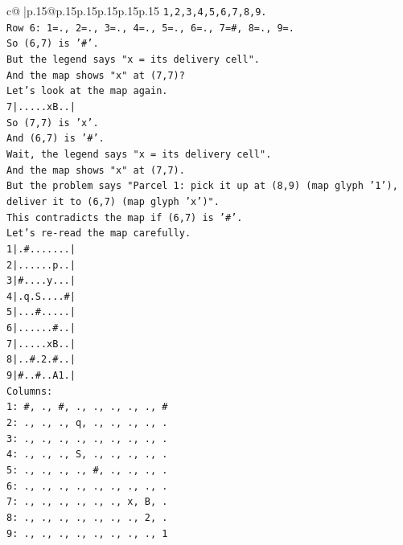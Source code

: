 \documentclass{article}
\begin{document}
{\begin{supertabular}{c@{$\;$}|p{.15\linewidth}@{}p{.15\linewidth}p{.15\linewidth}p{.15\linewidth}p{.15\linewidth}p{.15\linewidth}}
{{{\texttt{1,2,3,4,5,6,7,8,9.} \\
\texttt{Row 6: 1=., 2=., 3=., 4=., 5=., 6=., 7=\#, 8=., 9=.} \\
\texttt{So (6,7) is '\#'.} \\
\texttt{But the legend says "x = its delivery cell".} \\
\texttt{And the map shows "x" at (7,7)?} \\
\texttt{Let's look at the map again.} \\
\texttt{7|.....xB..|} \\
\texttt{So (7,7) is 'x'.} \\
\texttt{And (6,7) is '\#'.} \\
\texttt{Wait, the legend says "x = its delivery cell".} \\
\texttt{And the map shows "x" at (7,7).} \\
\texttt{But the problem says "Parcel 1: pick it up at (8,9) (map glyph '1'), deliver it to (6,7) (map glyph 'x')".} \\
\texttt{This contradicts the map if (6,7) is '\#'.} \\
\texttt{Let's re{-}read the map carefully.} \\
\texttt{1|.\#.......|} \\
\texttt{2|......p..|} \\
\texttt{3|\#....y...|} \\
\texttt{4|.q.S....\#|} \\
\texttt{5|...\#.....|} \\
\texttt{6|......\#..|} \\
\texttt{7|.....xB..|} \\
\texttt{8|..\#.2.\#..|} \\
\texttt{9|\#..\#..A1.|} \\
\texttt{Columns:} \\
\texttt{1: \#, ., \#, ., ., ., ., ., \#} \\
\texttt{2: ., ., ., q, ., ., ., ., .} \\
\texttt{3: ., ., ., ., ., ., ., ., .} \\
\texttt{4: ., ., ., S, ., ., ., ., .} \\
\texttt{5: ., ., ., ., \#, ., ., ., .} \\
\texttt{6: ., ., ., ., ., ., ., ., .} \\
\texttt{7: ., ., ., ., ., ., x, B, .} \\
\texttt{8: ., ., ., ., ., ., ., 2, .} \\
\texttt{9: ., ., ., ., ., ., ., ., 1} \\
}}}
\end{supertabular}}
\end{document}
